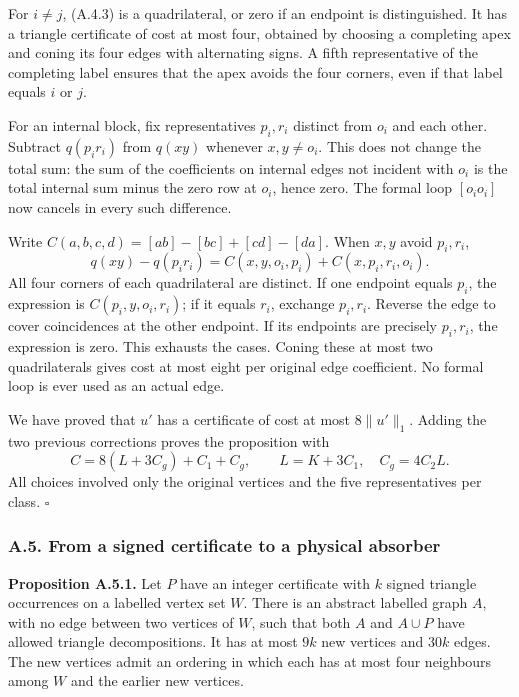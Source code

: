 \documentclass[english,11pt,a4paper]{article}
\begin{document}
For \(i\ne j\), (A.4.3) is a quadrilateral, or zero if an endpoint is distinguished. It has a triangle certificate of cost at most four, obtained by choosing a completing apex and coning its four edges with alternating signs. A fifth representative of the completing label ensures that the apex avoids the four corners, even if that label equals \(i\) or \(j\).

For an internal block, fix representatives \(p_i,r_i\) distinct from \(o_i\) and each other. Subtract \(q(p_ir_i)\) from \(q(xy)\) whenever \(x,y\ne o_i\). This does not change the total sum: the sum of the coefficients on internal edges not incident with \(o_i\) is the total internal sum minus the zero row at \(o_i\), hence zero. The formal loop \([o_io_i]\) now cancels in every such difference.

Write \(C(a,b,c,d)=[ab]-[bc]+[cd]-[da]\). When \(x,y\) avoid \(p_i,r_i\), \[q(xy)-q(p_ir_i)
=C(x,y,o_i,p_i)+C(x,p_i,r_i,o_i).
\tag{A.4.4}\] All four corners of each quadrilateral are distinct. If one endpoint equals \(p_i\), the expression is \(C(p_i,y,o_i,r_i)\); if it equals \(r_i\), exchange \(p_i,r_i\). Reverse the edge to cover coincidences at the other endpoint. If its endpoints are precisely \(p_i,r_i\), the expression is zero. This exhausts the cases. Coning these at most two quadrilaterals gives cost at most eight per original edge coefficient. No formal loop is ever used as an actual edge.

We have proved that \(u'\) has a certificate of cost at most \(8\|u'\|_1\). Adding the two previous corrections proves the proposition with \[C=8(L+3C_g)+C_1+C_g,
\qquad L=K+3C_1,\quad C_g=4C_2L.
\tag{A.4.5}\] All choices involved only the original vertices and the five representatives per class. \(\square\)

\subsubsection{A.5. From a signed certificate to a physical absorber}\label{a.5.-from-a-signed-certificate-to-a-physical-absorber}

\textbf{Proposition A.5.1.} Let \(P\) have an integer certificate with \(k\) signed triangle occurrences on a labelled vertex set \(W\). There is an abstract labelled graph \(A\), with no edge between two vertices of \(W\), such that both \(A\) and \(A\cup P\) have allowed triangle decompositions. It has at most \(9k\) new vertices and \(30k\) edges. The new vertices admit an ordering in which each has at most four neighbours among \(W\) and the earlier new vertices.
\end{document}

